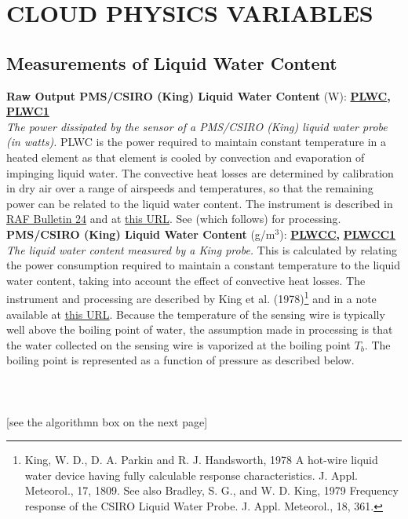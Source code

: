 
\section{CLOUD PHYSICS VARIABLES}

\subsection{Measurements of Liquid Water Content}
\begin{hangparagraphs}
\textbf{Raw Output PMS/CSIRO (King) Liquid Water Content} (W):\textbf{
}\textbf{\uline{PLWC}}\textbf{,
}\textbf{\uline{PLWC1}}\label{punch:5-3}\\
\emph{The power dissipated by the sensor of a PMS/CSIRO
(King) liquid water probe (in watts).
}PLWC is the power required to maintain constant temperature in a
heated element as that element is cooled by convection and evaporation
of impinging liquid water. The convective heat losses are determined
by calibration in dry air over a range of airspeeds and temperatures,
so that the remaining power can be related to the liquid water content.
The instrument is described in \href{http://www.eol.ucar.edu/raf/Bulletins/bulletin24.html}{RAF Bulletin 24}
and at \href{http://www.eol.ucar.edu/instruments/king-csiro-liquid-water-sensor}{this URL}.
See  (which follows) for processing.\\

\textbf{\label{PLWCC}PMS/CSIRO (King) Liquid Water Content} (g/m$^{3}$):\textbf{
}\textbf{\uline{PLWCC}}\textbf{,
}\textbf{\uline{PLWCC1}}\\
\emph{The liquid water content}
\emph{measured by a King probe.} This is calculated by relating the
power consumption required to maintain a constant temperature to the
liquid water content, taking into account the effect of convective
heat losses. The instrument and processing are described by King et
al. (1978)\footnote{King, W. D., D. A. Parkin and R. J. Handsworth, 1978 A hot-wire liquid
water device having fully calculable response characteristics. J.
Appl. Meteorol., 17, 1809. See also Bradley, S. G.,
and W. D. King, 1979 Frequency response of the CSIRO Liquid Water
Probe. J. Appl. Meteorol., 18, 361.} and in a note available at \href{https://drive.google.com/open?id=0B1kIUH45ca5AUkFDWmRwci12eVU}{this URL}.
Because the temperature of the sensing wire is typically well above
the boiling point of water, the assumption
made in processing is that the water collected on the sensing wire
is vaporized at the boiling point $T_{b}$. The boiling point is represented
as a function of pressure as described below. \\
\\
\\
\\
{[}see the algorithmn box on the next page{]}\\
\vfill


\end{hangparagraphs}
